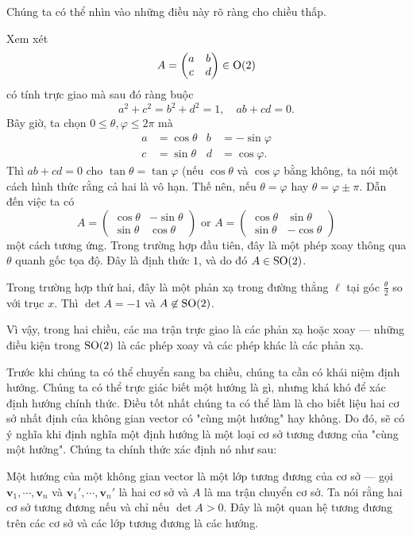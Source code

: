Chúng ta có thể nhìn vào những điều này rõ ràng cho chiều thấp.
\begin{eg}
  Xem xét
  \[
    A =
    \begin{pmatrix}
      a & b\\
      c & d
    \end{pmatrix} \in \mathrm{O}(2)
  \]
  có tính trực giao mà sau đó ràng buộc
  \[
    a^2 + c^2 = b^2 + d^2 = 1,\quad ab + cd = 0.
  \]
  Bây giờ, ta chọn $0 \leq \theta, \varphi \leq 2\pi$ mà
  \begin{align*}
    a &= \cos \theta & b &= -\sin \varphi\\
    c &= \sin \theta & d &= \cos \varphi.
  \end{align*}
  Thì $ab + cd = 0$ cho $\tan \theta = \tan \varphi$ (nếu $\cos \theta$ và $\cos \varphi$ bằng không, ta nói một cách hình thức rằng cả hai là vô hạn. Thế nên, nếu $\theta = \varphi$ hay $\theta = \varphi \pm \pi$. Dẫn đến việc ta có
  \[
    A=
    \begin{pmatrix}
      \cos \theta & -\sin \theta\\
      \sin \theta & \cos \theta
    \end{pmatrix}\text{ or }
    A =
    \begin{pmatrix}
      \cos \theta & \sin \theta\\
      \sin \theta & -\cos \theta
    \end{pmatrix}
  \]
  một cách tương ứng. Trong trường hợp đầu tiên, đây là một phép xoay thông qua $\theta $ quanh gốc tọa độ. Đây là định thức $1$, và do đó $A \in \mathrm{SO}(2)$.
 
  Trong trường hợp thứ hai, đây là một phản xạ trong đường thẳng $\ell$ tại góc $\frac{\theta}{2}$ so với trục $x$. Thì $\det A = -1$ và $A \not\in \mathrm{SO}(2)$.

  Vì vậy, trong hai chiều, các ma trận trực giao là các phản xạ hoặc xoay --- những điều kiện trong $\mathrm{SO}(2)$ là các phép xoay và các phép khác là các phản xạ.
\end{eg}
Trước khi chúng ta có thể chuyển sang ba chiều, chúng ta cần có khái niệm định hướng. Chúng ta có thể trực giác biết một hướng là gì, nhưng khá khó để xác định hướng chính thức. Điều tốt nhất chúng ta có thể làm là cho biết liệu hai cơ sở nhất định của không gian vector có "cùng một hướng" hay không. Do đó, sẽ có ý nghĩa khi định nghĩa một định hướng là một loại cơ sở tương đương của "cùng một hướng". Chúng ta chính thức xác định nó như sau:
\begin{defi}[Hướng]
  Một hướng của một không gian vector là một lớp tương đương của cơ sở --- gọi $\mathbf{v}_1, \cdots, \mathbf{v}_n$ và $\mathbf{v}_1', \cdots, \mathbf{v}_n'$ là hai cơ sở và $A$ là ma trận chuyển cơ sở. Ta nói rằng hai cơ sở tương đương nếu và chỉ nếu $\det A> 0 $. Đây là một quan hệ tương đương trên các cơ sở và các lớp tương đương là các hướng.
\end{defi}

